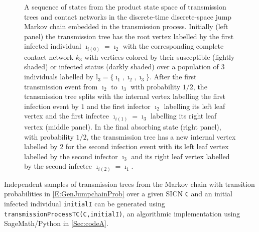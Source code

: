 \documentclass[review]{elsarticle}
\numberwithin{equation}{section}
\let\orgautoref\autoref
\renewcommand{\autoref}
        {\def\equationautorefname{Eq.}%
         \def\figureautorefname{Fig.}%
         \def\subfigureautorefname{Fig.}%
         \def\sectionautorefname{Sect.}%
         \def\subsectionautorefname{Sect.}%
         \def\subsubsectionautorefname{Sect.}%
         \def\Itemautorefname{item}%
         \def\tableautorefname{Table}%
         \def\propositionautorefname{Prop.}%
         \def\corollaryautorefname{Corollary}%
         \def\theoremautorefname{Theorem}%
         \def\remarkautorefname{Remark}%
         \def\lemmaautorefname{Lemma}%
         \def\proofofautorefname{Proof}%
         \def\exampleautorefname{Example}%
         \orgautoref}
\newcommand{\bI}{{\mathbb I}}
\begin{document}
\begin{figure}[htbp]
\begin{center}
%
%
\begin{center}
\scalebox{.75}{

}
\end{center}
\caption{A sequence of states from the product state space of transmission trees and contact networks in the discrete-time discrete-space jump Markov chain embedded in the transmission process.  
Initially (left panel) the transmission tree has the root vertex labelled by the first infected individual $\imath_{i(0)} = \imath_2$ with the corresponding complete contact network $k_3$ with vertices colored by their susceptible (lightly shaded) or infected status (darkly shaded) over a population of $3$ individuals labelled by $\bI_3=\{\imath_1,\imath_2,\imath_3\}$.  
After the first transmission event from $\imath_2$ to $\imath_3$ with probability $1/2$, 
the transmission tree splits with the internal vertex labelling the first infection event by $1$ and the first infector $\imath_2$ labelling its left leaf vertex and the first infectee $\imath_{i(1)}=\imath_3$ labelling its right leaf vertex (middle panel).  
In the final absorbing state (right panel), with probability $1/2$, the transmission tree has a new internal vertex labelled by $2$ for the second infection event with its left leaf vertex labelled by the second infector $\imath_3$ and its right leaf vertex labelled by the second infectee $\imath_{i(2)}=\imath_1$.\label{F:transTreeNetwork}}
\end{center}
\end{figure}

Independent samples of transmission trees from the Markov chain with transition probabilities in \autoref{E:GenJumpchainProb} over a given SICN {\tt C} and an initial infected individual {\tt initialI} can be generated using {\tt transmissionProcessTC(C,initialI)}, an algorithmic implementation using SageMath/Python \citep{sage} in \autoref{Sec:codeA}.
\end{document}
